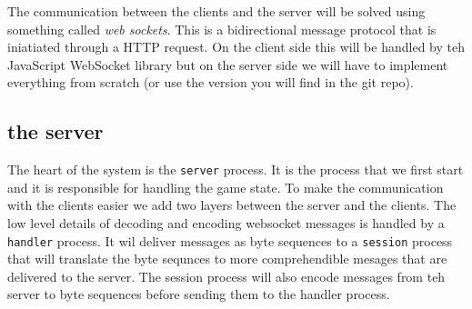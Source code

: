 \documentclass[a4paper,11pt]{article}
\begin{document}
The communication between the clients and
the server will be solved using something called {\em web
  sockets}. This is a bidirectional message protocol that is
iniatiated through a HTTP request. On the client side this will be
handled by teh JavaScript WebSocket library but on the server side we
will have to implement everything from scratch (or use the version you
will find in the git repo).

\subsection*{the server}

The heart of the system is the {\tt server} process. It is the process
that we first start and it is responsible for handling the game
state. To make the communication with the clients easier we add two
layers between the server and the clients. The low level details of
decoding and encoding websocket messages is handled by a {\tt handler}
process. It wil deliver messages as byte sequences to a {\tt session}
process that will translate the byte sequnces to more comprehendible
mesages that are delivered to the server. The session process will
also encode messages from teh server to byte sequences before sending
them to the handler process. 
\end{document}
